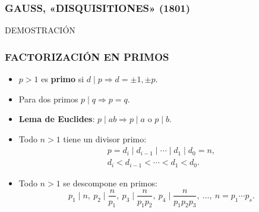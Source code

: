 \begin{frame}
  \frametitle{GAUSS, «DISQUISITIONES» (1801)}

\end{frame}

\begin{frame}

  \vfill

  \begin{center}\huge\headingfont
    DEMOSTRACIÓN
  \end{center}

  \vfill
\end{frame}

\begin{frame}
  \frametitle{FACTORIZACIÓN EN PRIMOS}

  \begin{itemize}
  \item<2-> $p > 1$ es \textbf{primo} si
    $d \mid p \Longrightarrow d = \pm 1, \pm p$.

  \item<3-> Para dos primos $p \mid q \Longrightarrow p = q$.

  \item<4-> \textbf{Lema de Euclides}:
    $p \mid ab \Longrightarrow p\mid a \text{ o }p\mid b$.

  \item<5-> Todo $n > 1$ tiene un divisor primo:
    \begin{gather*}
      p = d_i \mid d_{i-1} \mid \cdots \mid d_1 \mid d_0 = n, \\
      d_i < d_{i-1} < \cdots < d_1 < d_0.
    \end{gather*}

  \item<6-> Todo $n > 1$ se descompone en primos:
    $$p_1 \mid n, ~ p_2 \mid \frac{n}{p_1}, ~ p_3 \mid \frac{n}{p_1 p_2}, ~ p_4 \mid \frac{n}{p_1 p_2 p_3}, ~ \ldots, ~ n = p_1 \cdots p_s.$$
  \end{itemize}
\end{frame}

